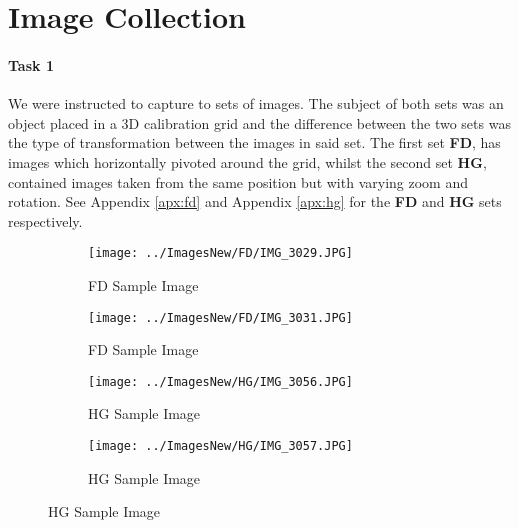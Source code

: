 \section{Image Collection}

\paragraph{Task 1} We were instructed to capture to sets of images. The subject of both sets was an object placed in a 3D calibration grid and the difference between the two sets was the type of transformation between the images in said set. The first set \textbf{FD}, has images which horizontally pivoted around the grid, whilst the second set \textbf{HG}, contained images taken from the same position but with varying zoom and rotation. See Appendix \ref{apx:fd} and Appendix \ref{apx:hg} for the \textbf{FD} and \textbf{HG} sets respectively.

\begin{figure}[ht]
\begin{center}
   \begin{subfigure}{0.49\linewidth}
   \centering
   \texttt{[image: ../ImagesNew/FD/IMG\_3029.JPG]}
   \caption{FD Sample Image}
   \label{fd:subfig:1}
   \end{subfigure}
   \begin{subfigure}{0.49\linewidth}
   \centering
   \texttt{[image: ../ImagesNew/FD/IMG\_3031.JPG]}
   \caption{FD Sample Image}
   \label{fd:subfig:2}
   \end{subfigure}
\newline
   \begin{subfigure}{0.49\linewidth}
   \centering
   \texttt{[image: ../ImagesNew/HG/IMG\_3056.JPG]}
   \caption{HG Sample Image}
   \label{hg:subfig:1}
   \end{subfigure}
   \begin{subfigure}{0.49\linewidth}
   \centering
   \texttt{[image: ../ImagesNew/HG/IMG\_3057.JPG]}
   \caption{HG Sample Image}
   \label{hg:subfig:2}
   \end{subfigure}
\end{center}
\label{fig:1}
\end{figure}